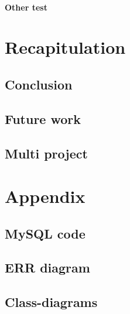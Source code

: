       \subsubsection{Other test}

\chapter{Recapitulation}
  \section{Conclusion}
  \section{Future work}
  \section{Multi project} %

\appendix
	\chapter{Appendix}
	\section{MySQL code}
	\label{MySQLcode}
		
	\section{ERR diagram}
	\label{errDiagram}
		
	\section{Class-diagrams}
	\label{app:Class-diagrams}
        



\appendix



